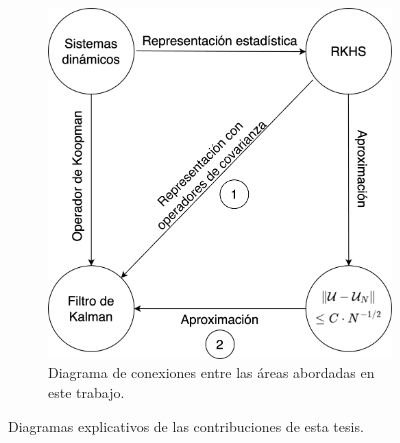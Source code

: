\begin{figure}[h]
\begin{subfigure}[b]{0.45\linewidth}
        \includegraphics[width=0.9\linewidth]{img/content/chapter1/diag_contri.png}
        \caption{Diagrama de conexiones entre las áreas abordadas en este trabajo.}
        \label{fig:conexiones}
    \end{subfigure}
    \caption{Diagramas explicativos de las contribuciones de esta tesis.}
\end{figure}
